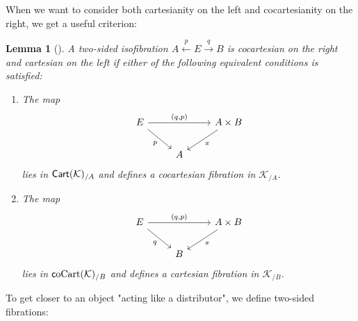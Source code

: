 \documentclass[10pt,a4paper]{article}
\newcommand{\ca}[1]{\mathcal{#1}}
\newcommand{\cat}[1]{\textcat{#1}}
\newcommand{\textcat}[1]{{\normalfont\textsf{#1}}}
\DeclareMathOperator{\Cart}{\cat{Cart}}
\DeclareMathOperator{\coCart}{\cat coCart}
\theoremstyle{plain}
\newtheorem{lemma}[theorem]{Lemma}
\theoremstyle{definition}
\theoremstyle{remark}
\begin{document}
When we want to consider both cartesianity on the left and cocartesianity on the right, we get a useful criterion:

\begin{lemma}[{\cite[Corollary 7.1.3]{riehl_verity}}]
    A two-sided isofibration $A \xleftarrow{p} E \xrightarrow{q} B$ is cocartesian on the right and cartesian on the left if either of the following equivalent conditions is satisfied:
    \begin{enumerate}
        \item The map
            \[\begin{tikzcd}
                \ar[dr, "p"'] E \ar[rr, "{(q, p)}"] && A\times B \ar[dl, "\pi"]\\
                                                    & A
            \end{tikzcd}\]
            lies in $\Cart(\ca K)_{/A}$ and defines a cocartesian fibration in $\ca K_{/A}$.
        \item The map
            \[\begin{tikzcd}
                \ar[dr, "q"'] E \ar[rr, "{(q, p)}"] && A\times B \ar[dl, "\pi"]\\
                                                    & B
            \end{tikzcd}\]
            lies in $\coCart(\ca K)_{/B}$ and defines a cartesian fibration in $\ca K_{/B}$.
    \end{enumerate}
\end{lemma}

To get closer to an object "acting like a distributor", we define two-sided fibrations:
\end{document}
